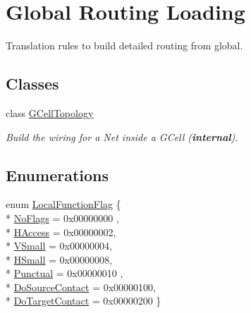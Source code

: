 \hypertarget{group__LoadGlobalRouting}{\section{Global Routing Loading}
\label{group__LoadGlobalRouting}
}


Translation rules to build detailed routing from global.  


\subsection*{Classes}
\begin{DoxyCompactItemize}
\item 
class \hyperlink{classanonymous__namespace_02LoadGrByNet_8cpp_03_1_1GCellTopology}{G\-Cell\-Topology}
\begin{DoxyCompactList}\small\item\em Build the wiring for a Net inside a G\-Cell ({\bfseries internal}). \end{DoxyCompactList}\end{DoxyCompactItemize}
\subsection*{Enumerations}
\begin{DoxyCompactItemize}
\item 
enum \hyperlink{group__LoadGlobalRouting_gaec07c7f30c801c3b0f72193757250d64}{Local\-Function\-Flag} \{ \\*
\hyperlink{group__LoadGlobalRouting_ggaec07c7f30c801c3b0f72193757250d64add44bf8d6f7bbe1393d76b940b85294b}{No\-Flags} = 0x00000000
, \\*
\hyperlink{group__LoadGlobalRouting_ggaec07c7f30c801c3b0f72193757250d64a5c3692a6c886c6293a3c9f240b60a5d9}{H\-Access} = 0x00000002, 
\\*
\hyperlink{group__LoadGlobalRouting_ggaec07c7f30c801c3b0f72193757250d64a260f6bf57246879aed7febfe83c9dacc}{V\-Small} = 0x00000004, 
\\*
\hyperlink{group__LoadGlobalRouting_ggaec07c7f30c801c3b0f72193757250d64af1a4f1cb841460f20d26dcf902247fb8}{H\-Small} = 0x00000008, 
\\*
\hyperlink{group__LoadGlobalRouting_ggaec07c7f30c801c3b0f72193757250d64a65b52a199afe857e3d551dbac8b293b9}{Punctual} = 0x00000010
, \\*
\hyperlink{group__LoadGlobalRouting_ggaec07c7f30c801c3b0f72193757250d64aece46caaf822b33d7db94bb2dd16a30d}{Do\-Source\-Contact} = 0x00000100, 
\\*
\hyperlink{group__LoadGlobalRouting_ggaec07c7f30c801c3b0f72193757250d64aeb33c01c5e62df73de6b11888b17a5f2}{Do\-Target\-Contact} = 0x00000200
 \}
\end{DoxyCompactItemize}
